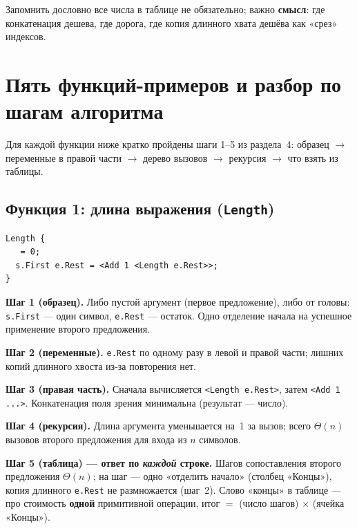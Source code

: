\documentclass[12pt,a4paper]{article}
\begin{document}
Запомнить дословно все числа в таблице не обязательно; важно \textbf{смысл}: где конкатенация дешева, где дорога, где копия длинного хвата дешёва как «срез» индексов.

\section{Пять функций-примеров и разбор по шагам алгоритма}

Для каждой функции ниже кратко пройдены шаги 1--5 из раздела~4: образец \(\rightarrow\) переменные в правой части \(\rightarrow\) дерево вызовов \(\rightarrow\) рекурсия \(\rightarrow\) что взять из таблицы.

\subsection{Функция 1: длина выражения (\texttt{Length})}

\begin{lstlisting}
Length {
   = 0;
  s.First e.Rest = <Add 1 <Length e.Rest>>;
}
\end{lstlisting}

\textbf{Шаг 1 (образец).} Либо пустой аргумент (первое предложение), либо от головы: \texttt{s.First} --- один символ, \texttt{e.Rest} --- остаток. Одно отделение начала на успешное применение второго предложения.

\textbf{Шаг 2 (переменные).} \texttt{e.Rest} по одному разу в левой и правой части; лишних копий длинного хвоста из-за повторения нет.

\textbf{Шаг 3 (правая часть).} Сначала вычисляется \texttt{<Length e.Rest>}, затем \texttt{<Add 1 ...>}. Конкатенация поля зрения минимальна (результат --- число).

\textbf{Шаг 4 (рекурсия).} Длина аргумента уменьшается на~1 за вызов; всего \(\Theta(n)\) вызовов второго предложения для входа из \(n\) символов.

\textbf{Шаг 5 (таблица) --- ответ по \emph{каждой} строке.} Шагов сопоставления второго предложения \(\Theta(n)\); на шаг --- одно «отделить начало» (столбец «Концы»), копия длинного \texttt{e.Rest} не размножается (шаг~2). Слово «концы» в таблице --- про стоимость \textbf{одной} примитивной операции, итог \(=\) (число шагов) \(\times\) (ячейка «Концы»).
\end{document}
